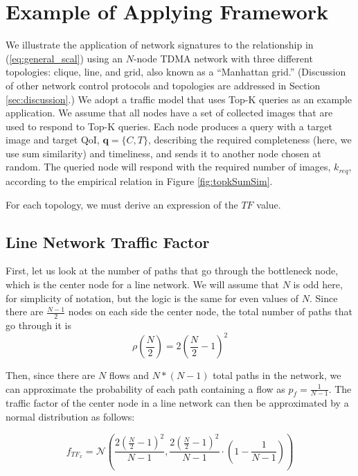 \section{Example of Applying Framework}
\label{sec:example_applications}

We illustrate the application of network signatures to the relationship in (\ref{eq:general_scal}) using an $N$-node TDMA network with three different topologies: clique, line, and grid, also known as a ``Manhattan grid.''  (Discussion of other network control protocols and topologies are addressed in Section \ref{sec:discussion}.)  We adopt a traffic model that uses Top-K queries as an example application.  We assume that all nodes have a set of collected images that are used to respond to Top-K queries.  Each node produces a query with a target image and target QoI, $\mathbf{q} = \{C, T\}$, describing the required completeness (here, we use sum similarity) and timeliness, and sends it to another node chosen at random.  The queried node will respond with the required number of images, $k_{req}$, according to the empirical relation in Figure \ref{fig:topkSumSim}.

For each topology, we must derive an expression of the $TF$ value.

\subsection{Line Network Traffic Factor}

First, let us look at the number of paths that go through the bottleneck node, which is the center node for a line network.  We will assume that $N$ is odd here, for simplicity of notation, but the logic is the same for even values of $N$.  Since there are $\frac{N-1}{2}$ nodes on each side the center node, the total number of paths that go through it is
\begin{equation*}
	\rho(\frac{N}{2}) = 2(\frac{N}{2}-1)^2
\end{equation*}

Then, since there are $N$ flows and $N*(N-1)$ total paths in the network, we can approximate the probability of each path containing a flow as $p_f = \frac{1}{N-1}$.  The traffic factor of the center node in a line network can then be approximated by a normal distribution as follows:

\begin{equation*}
	f_{TF_x} = \mathcal{N}( \frac{2(\frac{N}{2}-1)^2}{N-1}, \frac{2(\frac{N}{2}-1)^2}{N-1} \cdot ( 1 - \frac{1}{N-1} )  )
\end{equation*}

